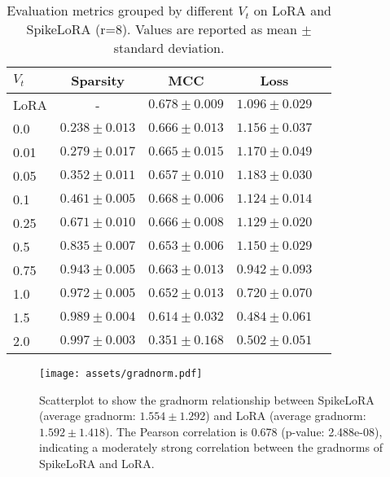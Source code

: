 \documentclass{article} %
\begin{document}
\begin{table}[htbp]
    \centering
    \begin{tabular}{lcccc}
    \toprule
    \(V_t\) & Sparsity & MCC & Loss \\
    \midrule
    LoRA & - & \(\mathbf{0.678\pm0.009}\) & \(1.096\pm0.029\) \\
    \midrule
    0.0 & \(0.238\pm0.013\) & \(0.666\pm0.013\) & \(1.156\pm0.037\) \\
    0.01 & \(0.279\pm0.017\) & \(0.665\pm0.015\) & \(1.170\pm0.049\) \\
    0.05 & \(0.352\pm0.011\) & \(0.657\pm0.010\) & \(1.183\pm0.030\) \\
    0.1 & \(0.461\pm0.005\) & \(0.668\pm0.006\) & \(1.124\pm0.014\) \\
    0.25 & \(0.671\pm0.010\) & \(0.666\pm0.008\) & \(1.129\pm0.020\) \\
    0.5 & \(0.835\pm0.007\) & \(0.653\pm0.006\) & \(1.150\pm0.029\) \\
    0.75 & \(0.943\pm0.005\) & \(0.663\pm0.013\) & \(0.942\pm0.093\) \\
    1.0 & \(0.972\pm0.005\) & \(0.652\pm0.013\) & \(0.720\pm0.070\) \\
    1.5 & \(0.989\pm0.004\) & \(0.614\pm0.032\) & \(\mathbf{0.484\pm0.061}\) \\
    2.0 & \(0.997\pm0.003\) & \(0.351\pm0.168\) & \(0.502\pm0.051\) \\
    \bottomrule
    \end{tabular}
    \caption{Evaluation metrics grouped by different \(V_t\) on LoRA and SpikeLoRA (r=8). Values are reported as mean \(\pm\) standard deviation.}
\end{table}

\begin{figure}[htbp]
  \centering
  \texttt{[image: assets/gradnorm.pdf]}
  \caption{Scatterplot to show the gradnorm relationship between SpikeLoRA (average gradnorm: \(1.554\pm 1.292\)) and LoRA (average gradnorm: \(1.592\pm 1.418\)). The Pearson correlation is 0.678 (p-value: 2.488e-08), indicating a moderately strong correlation between the gradnorms of SpikeLoRA and LoRA.}
  \label{fig:gradnorm}
\end{figure}
\end{document}
